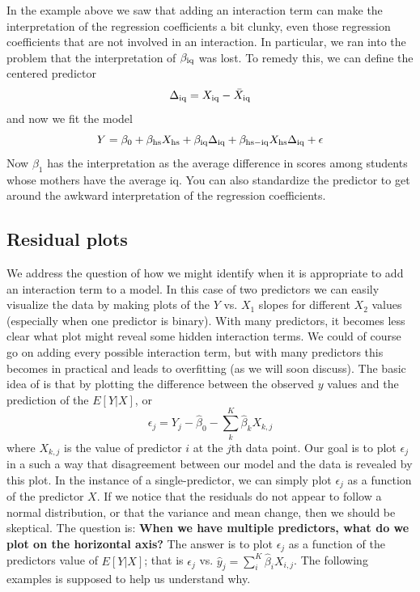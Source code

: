In the example above we saw that adding an interaction term can make the interpretation  of the regression coefficients a bit clunky, even those regression coefficients that are not involved in an interaction. In particular, we ran into the problem that the interpretation of $\beta_{\rm iq}$ was lost. To remedy this, we can define the centered predictor
\begin{equation*}
\Delta_{\rm iq} = X_{\rm iq} - \bar{X}_{\rm iq} 
\end{equation*}
and now we fit the model 
\begin{equation*}
Y =  \beta_0 +  \beta_{\rm hs} X_{\rm hs} + \beta_{\rm iq}\Delta_{\rm iq} +  \beta_{\rm hs-iq}X_{\rm hs}\Delta_{\rm iq} + \epsilon 
\end{equation*}
Now $\beta_1$ has the interpretation as the average difference in scores among students whose mothers have the average iq. You can also standardize the predictor to get around the awkward interpretation of the regression coefficients. 






\subsection{Residual plots}


 We address the question of how we might identify when it is appropriate to add an interaction term to a model. In this case of two predictors we can easily visualize the data by making plots of the $Y$ vs. $X_1$ slopes for different $X_2$ values (especially  when one predictor is binary). With many predictors, it becomes less clear what plot might reveal some hidden interaction terms. We could of course go on adding every possible interaction term, but with many predictors this becomes in practical and leads to overfitting (as we will soon discuss). 
 The basic idea of  is that by plotting the difference between the observed $y$ values and the prediction of the $E[Y|X]$, or 
\begin{equation*}
\epsilon_j  = Y_j - \hat{\beta}_0 - \sum_k^{K}\hat{\beta}_kX_{k,j}
\end{equation*}
where $X_{k,j}$ is the value of predictor $i$ at the $j$th data point. 
Our goal is to plot $\epsilon_j$ in a such a way that disagreement between our model and the data is revealed by this plot.  In the instance of a single-predictor, we can simply plot $\epsilon_j$ as a function of the predictor $X$. If we notice that the residuals do not appear to follow a normal distribution, or that the variance and mean change, then we should be skeptical.
 The question is: {\bf When we have multiple predictors, what do we plot on the horizontal axis?}   The answer is to plot $\epsilon_j$ as a function of the predictors value of $E[Y|X]$; that is $\epsilon_j$ vs. $\hat{y}_j = \sum_i^{K} \hat{\beta}_iX_{i,j}$. The following examples is supposed to help us understand why. 




